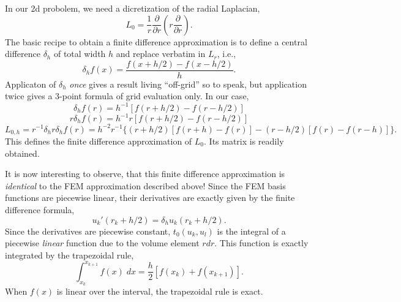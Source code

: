 \documentclass{article}
\begin{document}
In our 2d probolem, we need a dicretization of the radial Laplacian,
\begin{equation}
    L_0 = \frac{1}{r} \frac{\partial}{\partial r} \left( r \frac{\partial}{\partial r} \right).
\end{equation}
The basic recipe to obtain a finite difference approximation is to define a central difference $\delta_h$ of total width $h$ and replace verbatim in $L_r$, i.e.,
\begin{equation}
    \delta_h f(x) = \frac{f(x+h/2) - f(x-h/2)}{h}.
\end{equation}
Applicaton of $\delta_h$ \emph{once} gives a result living ``off-grid'' so to speak, but application twice gives a 3-point formula of grid evaluation only. In our case,
\begin{equation}
    \delta_h f(r) = h^{-1}[f(r+h/2) - f(r-h/2)]
\end{equation}
\begin{equation}
    r \delta_h f(r) = h^{-1} r [f(r+h/2) - f(r-h/2)]
\end{equation}
\begin{equation}
    L_{0,h} = r^{-1} \delta_h r \delta_h f(r) = h^{-2} r^{-1} \{ (r+h/2) [f(r+h) - f(r)] - (r-h/2) [f(r) - f(r-h)] \}.
\end{equation}
This defines the finite difference approximation of $L_0$. Its matrix is readily obtained.

It is now interesting to observe, that this finite difference approximation is \emph{identical} to the FEM approximation described above! Since the FEM basis functions are piecewise linear, their derivatives are exactly given by the finite difference formula,
\begin{equation}
    u_k'(r_k + h/2) = \delta_h u_k(r_k + h/2).
\end{equation}
Since the derivatives are piecewise constant, $t_0(u_k,u_l)$ is the integral of a piecewise \emph{linear} function due to the volume element $r dr$. This function is exactly integrated by the trapezoidal rule,
\begin{equation}
    \int_{x_k}^{x_{k+1}} f(x) \; dx = \frac{h}{2} [f(x_k) + f(x_{k+1})].
\end{equation}
When $f(x)$ is linear over the interval, the trapezoidal rule is exact.
\end{document}
